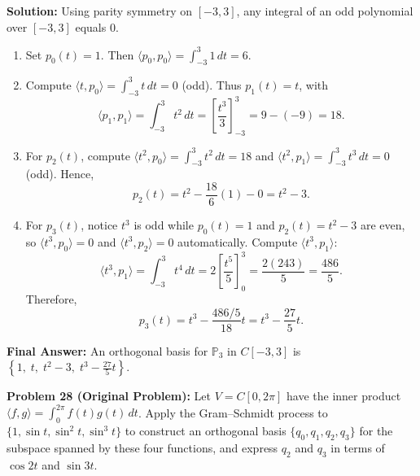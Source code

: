 \documentclass[11pt, letterpaper]{article}
\theoremstyle{definition}
\theoremstyle{remark}
\begin{document}
\textbf{Solution:} Using parity symmetry on $[-3, 3]$, any integral of an odd polynomial over $[-3, 3]$ equals $0$.
\begin{enumerate}
    \item Set $p_0(t) = 1$. Then $\langle p_0, p_0 \rangle = \int_{-3}^3 1\,dt = 6$.
    \item Compute $\langle t, p_0 \rangle = \int_{-3}^3 t\,dt = 0$ (odd). Thus $p_1(t) = t$, with
    \[
    \langle p_1, p_1 \rangle = \int_{-3}^3 t^2\,dt = \left[\frac{t^3}{3}\right]_{-3}^3 = 9 - (-9) = 18.
    \]
    \item For $p_2(t)$, compute $\langle t^2, p_0 \rangle = \int_{-3}^3 t^2\,dt = 18$ and $\langle t^2, p_1 \rangle = \int_{-3}^3 t^3\,dt = 0$ (odd). Hence,
    \[
    p_2(t) = t^2 - \frac{18}{6}(1) - 0 = t^2 - 3.
    \]
    \item For $p_3(t)$, notice $t^3$ is odd while $p_0(t) = 1$ and $p_2(t) = t^2 - 3$ are even, so $\langle t^3, p_0 \rangle = 0$ and $\langle t^3, p_2 \rangle = 0$ automatically. Compute $\langle t^3, p_1 \rangle$:
    \[
    \langle t^3, p_1 \rangle = \int_{-3}^3 t^4\,dt = 2\left[\frac{t^5}{5}\right]_0^3 = \frac{2(243)}{5} = \frac{486}{5}.
    \]
    Therefore,
    \[
    p_3(t) = t^3 - \frac{486/5}{18}t = t^3 - \frac{27}{5}t.
    \]
\end{enumerate}
\textbf{Final Answer:} An orthogonal basis for $\mathbb{P}_3$ in $C[-3, 3]$ is $\left\{1,\; t,\; t^2 - 3,\; t^3 - \frac{27}{5}t\right\}$.

\medskip

\textbf{Problem 28 (Original Problem):} Let $V = C[0, 2\pi]$ have the inner product $\langle f, g \rangle = \int_0^{2\pi} f(t)g(t)\,dt$. Apply the Gram--Schmidt process to $\{1, \sin t, \sin^2 t, \sin^3 t\}$ to construct an orthogonal basis $\{q_0, q_1, q_2, q_3\}$ for the subspace spanned by these four functions, and express $q_2$ and $q_3$ in terms of $\cos 2t$ and $\sin 3t$.
\end{document}
